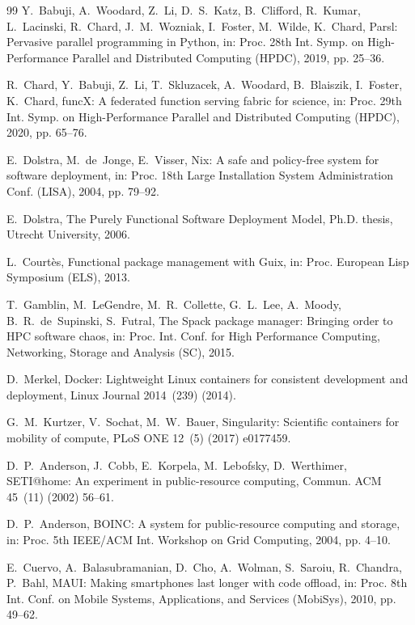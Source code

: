 \documentclass[5p,times,twocolumn]{elsarticle}
\begin{document}
\begin{thebibliography}{99}
 Y.~Babuji, A.~Woodard, Z.~Li, D.~S.~Katz, B.~Clifford, R.~Kumar, L.~Lacinski, R.~Chard, J.~M.~Wozniak, I.~Foster, M.~Wilde, K.~Chard, Parsl: Pervasive parallel programming in Python, in: Proc. 28th Int. Symp. on High-Performance Parallel and Distributed Computing (HPDC), 2019, pp. 25--36.

 R.~Chard, Y.~Babuji, Z.~Li, T.~Skluzacek, A.~Woodard, B.~Blaiszik, I.~Foster, K.~Chard, funcX: A federated function serving fabric for science, in: Proc. 29th Int. Symp. on High-Performance Parallel and Distributed Computing (HPDC), 2020, pp. 65--76.

 E.~Dolstra, M.~de~Jonge, E.~Visser, Nix: A safe and policy-free system for software deployment, in: Proc. 18th Large Installation System Administration Conf. (LISA), 2004, pp. 79--92.

 E.~Dolstra, The Purely Functional Software Deployment Model, Ph.D. thesis, Utrecht University, 2006.

 L.~Court\`es, Functional package management with Guix, in: Proc. European Lisp Symposium (ELS), 2013.

 T.~Gamblin, M.~LeGendre, M.~R.~Collette, G.~L.~Lee, A.~Moody, B.~R.~de~Supinski, S.~Futral, The Spack package manager: Bringing order to HPC software chaos, in: Proc. Int. Conf. for High Performance Computing, Networking, Storage and Analysis (SC), 2015.

 D.~Merkel, Docker: Lightweight Linux containers for consistent development and deployment, Linux Journal 2014~(239) (2014).

 G.~M.~Kurtzer, V.~Sochat, M.~W.~Bauer, Singularity: Scientific containers for mobility of compute, PLoS ONE 12~(5) (2017) e0177459.

 D.~P.~Anderson, J.~Cobb, E.~Korpela, M.~Lebofsky, D.~Werthimer, SETI@home: An experiment in public-resource computing, Commun. ACM 45~(11) (2002) 56--61.

 D.~P.~Anderson, BOINC: A system for public-resource computing and storage, in: Proc. 5th IEEE/ACM Int. Workshop on Grid Computing, 2004, pp. 4--10.

 E.~Cuervo, A.~Balasubramanian, D.~Cho, A.~Wolman, S.~Saroiu, R.~Chandra, P.~Bahl, MAUI: Making smartphones last longer with code offload, in: Proc. 8th Int. Conf. on Mobile Systems, Applications, and Services (MobiSys), 2010, pp. 49--62.


\end{thebibliography}
\end{document}
